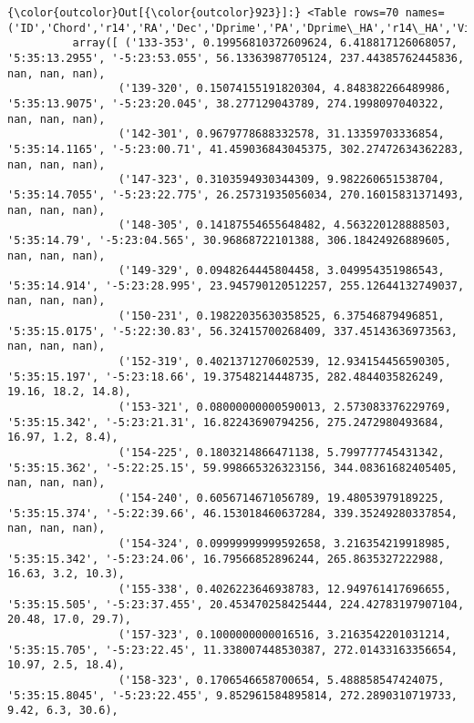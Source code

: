 \documentclass{article}
\begin{document}
            \begin{Verbatim}[commandchars=\\\{\}]
{\color{outcolor}Out[{\color{outcolor}923}]:} <Table rows=70 names=('ID','Chord','r14','RA','Dec','Dprime','PA','Dprime\_HA','r14\_HA','VicR14')>
          array([ ('133-353', 0.19956810372609624, 6.418817126068057, '5:35:13.2955', '-5:23:53.055', 56.13363987705124, 237.44385762445836, nan, nan, nan),
                 ('139-320', 0.15074155191820304, 4.848382266489986, '5:35:13.9075', '-5:23:20.045', 38.277129043789, 274.1998097040322, nan, nan, nan),
                 ('142-301', 0.9679778688332578, 31.13359703336854, '5:35:14.1165', '-5:23:00.71', 41.459036843045375, 302.27472634362283, nan, nan, nan),
                 ('147-323', 0.3103594930344309, 9.982260651538704, '5:35:14.7055', '-5:23:22.775', 26.25731935056034, 270.16015831371493, nan, nan, nan),
                 ('148-305', 0.14187554655648482, 4.563220128888503, '5:35:14.79', '-5:23:04.565', 30.96868722101388, 306.18424926889605, nan, nan, nan),
                 ('149-329', 0.0948264445804458, 3.049954351986543, '5:35:14.914', '-5:23:28.995', 23.945790120512257, 255.12644132749037, nan, nan, nan),
                 ('150-231', 0.19822035630358525, 6.37546879496851, '5:35:15.0175', '-5:22:30.83', 56.32415700268409, 337.45143636973563, nan, nan, nan),
                 ('152-319', 0.4021371270602539, 12.934154456590305, '5:35:15.197', '-5:23:18.66', 19.37548214448735, 282.4844035826249, 19.16, 18.2, 14.8),
                 ('153-321', 0.08000000000590013, 2.573083376229769, '5:35:15.342', '-5:23:21.31', 16.82243690794256, 275.2472980493684, 16.97, 1.2, 8.4),
                 ('154-225', 0.1803214866471138, 5.799777745431342, '5:35:15.362', '-5:22:25.15', 59.998665326323156, 344.08361682405405, nan, nan, nan),
                 ('154-240', 0.6056714671056789, 19.48053979189225, '5:35:15.374', '-5:22:39.66', 46.153018460637284, 339.35249280337854, nan, nan, nan),
                 ('154-324', 0.09999999999592658, 3.216354219918985, '5:35:15.342', '-5:23:24.06', 16.79566852896244, 265.8635327222988, 16.63, 3.2, 10.3),
                 ('155-338', 0.4026223646938783, 12.949761417696655, '5:35:15.505', '-5:23:37.455', 20.453470258425444, 224.42783197907104, 20.48, 17.0, 29.7),
                 ('157-323', 0.1000000000016516, 3.2163542201031214, '5:35:15.705', '-5:23:22.45', 11.338007448530387, 272.01433163356654, 10.97, 2.5, 18.4),
                 ('158-323', 0.1706546658700654, 5.488858547424075, '5:35:15.8045', '-5:23:22.455', 9.852961584895814, 272.2890310719733, 9.42, 6.3, 30.6),

\end{Verbatim}
\end{document}
